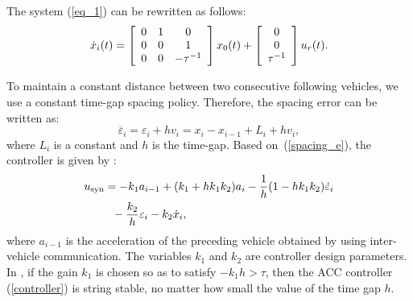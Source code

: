 \documentclass[letterpaper, 10 pt, conference]{ieeeconf}  %
\def\eqref#1{(\ref{#1})}
\begin{document}
The system \eqref{eq_1} can be rewritten as follows:
\begin{equation}\dot{x}_{i}(t)=\left[\begin{array}{c c c}{{0}}&{{1}}&{{0}}\\ {{0}}&{{0}}&{{1}}\\ {{0}}&{{0}}&{{-\tau^{-1}}}\end{array}\right]x_{0}(t)+\left[\begin{array}{c}{{0}}\\ {{0}}\\ {{\tau^{-1}}}\end{array}\right]u_{r}(t).\end{equation}






 To maintain a constant distance between two consecutive following vehicles, we use a constant time-gap spacing policy. Therefore, the spacing error can be written as: 
\begin{equation} \label{spacing_e}
 \overline{{{\varepsilon}}}_{i}=\varepsilon_{i}+h{v}_{i}=x_{i}-x_{i-1}+L_{i}+h{v}_{i},
\end{equation}
where ${L_i}$ is a constant and $h$ is the time-gap.
Based on~\eqref{spacing_e}, the controller is given by :
\begin{align}\label{controller}
        u_{\text{syn}}&=-k_{1}{a}_{i-1}+(k_{1}+h k_{1}k_{2}){a}_{i}-\frac{1}{h}(1-h k_{1}k_{2})\dot{\varepsilon}_{i}\notag\\
        &~~-\frac{k_{2}}{h}\varepsilon_{i}-k_{2}\dot{x}_{i},
\end{align}
where ${a}_{i-1}$ is the acceleration of the preceding vehicle obtained by using inter-vehicle communication.
The variables $k_1$ and $k_2$ are controller design parameters. In \cite{..}, if the gain $k_1$ is chosen so as to satisfy $-k_{1}h >\tau$, then the ACC controller \eqref{controller} is string 
stable, no matter how small the value of the time gap $h$. 
\end{document}
